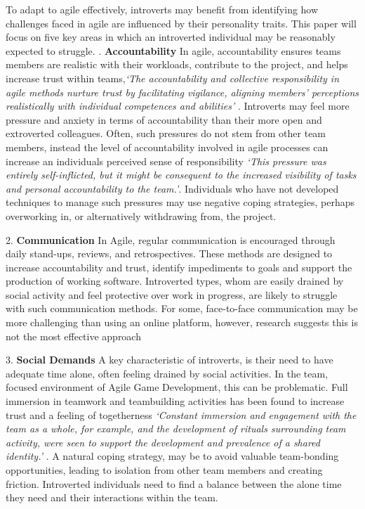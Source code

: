\documentclass{scrartcl}
\begin{document}
To adapt to agile effectively, introverts may benefit from identifying how challenges faced in agile are influenced by their personality traits. This paper will focus on five key areas in which an introverted individual may be reasonably expected to struggle. 
\newline
{}.	\textbf{Accountability} \newline
In agile, accountability ensures teams members are realistic with their workloads, contribute to the project, and helps increase trust within teams,\textit{`The accountability and collective responsibility in agile methods nurture trust by facilitating vigilance, aligning members' perceptions realistically with individual competences and abilities'} \cite[p. 73]{McHughConboyLang}. Introverts may feel more pressure and anxiety in terms of accountability than their more open and extroverted colleagues. Often, such pressures do not stem from other team members, instead the level of accountability involved in agile processes can increase an individuals perceived sense of responsibility \textit{`This pressure was entirely self-inflicted, but it might be consequent to the increased visibility of tasks and personal accountability to the team.'}\cite[p. 74]{McHughConboyLang}. Individuals who have not developed techniques to manage such pressures may use negative coping strategies, perhaps overworking in, or alternatively withdrawing from, the project.

2.	\textbf{Communication} \newline
In Agile, regular communication is encouraged through daily stand-ups, reviews, and retrospectives.  These methods are designed to increase accountability and trust, identify impediments to goals and support the production of working software. Introverted types, whom are easily drained by social activity and feel protective over work in progress, are likely to struggle with such communication methods. For some, face-to-face communication may be more challenging than using an online platform, however, research suggests this is not the most effective approach

3.	\textbf{Social Demands} \newline
A key characteristic of introverts, is their need to have adequate time alone, often feeling drained by social activities. In the team, focused environment of Agile Game Development, this can be problematic. Full immersion in teamwork and teambuilding activities has been found to increase trust and a feeling of togetherness \textit{`Constant immersion and engagement with the team as a whole, for example, and the development of rituals surrounding team activity, were seen to support the development and prevalence of a shared identity.'} \cite[p. 8]{WhitworthBiddle}. A natural coping strategy, may be to avoid valuable team-bonding opportunities, leading to isolation from other team members and creating friction. Introverted individuals need to find a balance between the alone time they need and their interactions within the team.
\end{document}
